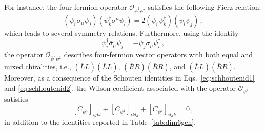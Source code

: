 


For instance, the four-fermion operator $\mathcal{O}_{\overline \psi^2 \psi^2}$ satisfies the following Fierz relation:
%
\begin{equation}
    (\psi_i^\dagger \overline \sigma_\mu \psi_j)(\psi_k^\dagger \overline \sigma^\mu \psi_l) = 2 (\psi_i^\dagger \psi_k^\dagger)( \psi_l \psi_j) \,,
\end{equation}
which leads to several symmetry relations. Furthermore, using the identity
%
\begin{equation}
    \psi_i^\dagger \overline \sigma_\mu \psi_j = - \psi_j \sigma_\mu \psi_i^\dagger \,,
\end{equation}
the operator $\mathcal{O}_{\overline \psi^2 \psi^2}$ describes four-fermion vector operators with both equal and mixed chiralities, i.e., $(\overline LL)(\overline LL)$, $(\overline RR)(\overline RR)$, and $(\overline LL)(\overline RR)$. 
Moreover, as a consequence of the Schouten identities in Eqs.~\eqref{eq:schhoutenid1} and \eqref{eq:schhoutenid2},
the Wilson coefficient associated with the operator $\mathcal O_{\psi^4}$ satisfies
\begin{equation}
    \left[C_{\psi^4}\right]_{ijkl} + \left[C_{\psi^4}\right]_{iklj} + \left[C_{\psi^4}\right]_{iljk} = 0\,,
\end{equation}
in addition to the identities reported in Table~\ref{tab:dim6gen}.

